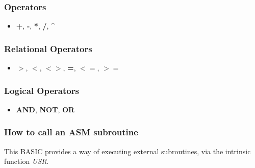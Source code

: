 \documentclass[a4paper,11pt]{article}
\begin{document}
    \subsubsection{Operators}

    \begin{itemize}
        \item \textbf{+}, \textbf{-}, \textbf{*}, \textbf{/},
        \textbf{\textasciicircum}
    \end{itemize}

    \subsubsection{Relational Operators}
    
    \begin{itemize}
        \item \textbf{$>$}, \textbf{$<$}, \textbf{$<>$}, \textbf{=},
        \textbf{$<=$}, \textbf{$>=$}
    \end{itemize}

    \subsubsection{Logical Operators}

    \begin{itemize}
        \item \textbf{AND}, \textbf{NOT}, \textbf{OR}
    \end{itemize}

    \subsubsection{How to call an ASM subroutine}

    This BASIC provides a way of executing external subroutines, via the
    intrinsic function \textit{USR}.
\end{document}
